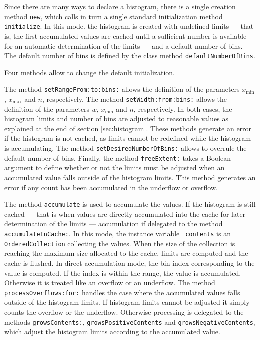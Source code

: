 Since there are many ways to declare a histogram, there is a
single creation method {\tt new}, which calls in turn a single
standard initialization method {\tt initialize}. In this mode. the
histogram is created with undefined limits --- that is, the first
accumulated values are cached until a sufficient number is
available for an automatic determination of the limits --- and a
default number of bins. The default number of bins is defined by
the class method {\tt defaultNumberOfBins}.

\noindent Four methods allow to change the default initialization.

The method {\tt setRangeFrom:to:bins:} allows the definition of
the parameters $x_{\min}$, $x_{\max}$ and $n$, respectively. The
method {\tt setWidth:from:bins:} allows the definition of the
parameters $w$, $x_{\min}$ and $n$, respectively. In both cases,
the histogram limits and number of bins are adjusted to reasonable
values as explained at the end of section \ref{sec:histogram}.
These methods generate an error if the histogram is not cached, as
limits cannot be redefined while the histogram is accumulating.
The method {\tt setDesiredNumberOfBins:} allows to overrule the
default number of bins. Finally, the method {\tt freeExtent:}
takes a Boolean argument to define whether or not the limits must
be adjusted when an accumulated value falls outside of the
histogram limits. This method generates an error if any count has
been accumulated in the underflow or overflow.

The method {\tt accumulate} is used to accumulate the values. If
the histogram is still cached --- that is when values are directly
accumulated into the cache for later determination of the limits
--- accumulation if delegated to the method {\tt
accumulateInCache:}. In this mode, the instance variable {\tt
contents} is an {\tt OrderedCollection} collecting the values.
When the size of the collection is reaching the maximum size
allocated to the cache, limits are computed and the cache is
flushed. In direct accumulation mode, the bin index corresponding
to the value is computed. If the index is within the range, the
value is accumulated. Otherwise it is treated like an overflow or
an underflow. The method {\tt processOverflows:for:} handles the
case where the accumulated values falls outside of the histogram
limits. If histogram limits cannot be adjusted it simply counts
the overflow or the underflow. Otherwise processing is delegated
to the methods {\tt growsContents:}, {\tt growsPositiveContents}
and {\tt growsNegativeContents}, which adjust the histogram limits
according to the accumulated value.

